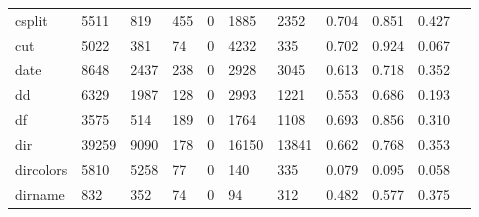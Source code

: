 \begin{longtable}{lp{1.10cm}p{1.10cm}p{1.10cm}p{1.10cm}p{1.10cm}p{1.10cm}p{1.10cm}p{1.10cm}p{1.10cm}p{1.10cm}}
csplit    &                   5511 &                                819 &                               455 &                                0 &                              1885 &                            2352 &                             0.704 &                                 0.851 &                               0.427 \\
cut       &                   5022 &                                381 &                                74 &                                0 &                              4232 &                             335 &                             0.702 &                                 0.924 &                               0.067 \\
date      &                   8648 &                               2437 &                               238 &                                0 &                              2928 &                            3045 &                             0.613 &                                 0.718 &                               0.352 \\
dd        &                   6329 &                               1987 &                               128 &                                0 &                              2993 &                            1221 &                             0.553 &                                 0.686 &                               0.193 \\
df        &                   3575 &                                514 &                               189 &                                0 &                              1764 &                            1108 &                             0.693 &                                 0.856 &                               0.310 \\
dir       &                  39259 &                               9090 &                               178 &                                0 &                             16150 &                           13841 &                             0.662 &                                 0.768 &                               0.353 \\
dircolors &                   5810 &                               5258 &                                77 &                                0 &                               140 &                             335 &                             0.079 &                                 0.095 &                               0.058 \\
dirname   &                    832 &                                352 &                                74 &                                0 &                                94 &                             312 &                             0.482 &                                 0.577 &                               0.375 \\

\end{longtable}
